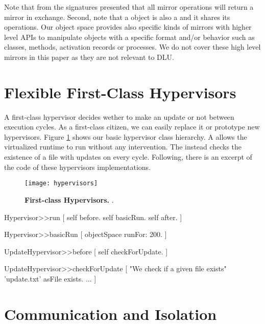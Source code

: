 Note that from the signatures presented that all mirror operations will return a mirror in exchange. Second, note that a  object is also a  and it shares its operations.
Our object space provides also specific kinds of mirrors with higher level APIs to manipulate objects with a specific format and/or behavior such as classes, methods, activation records or processes. We do not cover these high level mirrors in this paper as they are not relevant to DLU.


\section{Flexible First-Class Hypervisors}\label{sec:hypervisor}

A first-class hypervisor decides wether to make an update or not between execution cycles. As a first-class citizen, we can easily replace it or prototype new hypervisors. Figure \ref{fig:hypervisors} shows our basic hypervisor class hierarchy. A  allows the virtualized runtime to run without any intervention. The  instead checks the existence of a file with updates on every cycle. Following, there is an excerpt of the code of these hypervisors implementations.

\begin{figure}[ht]
\center
\texttt{[image: hypervisors]}
\caption{\textbf{First-class Hypervisors.} .\label{fig:hypervisors}}
\end{figure}

\begin{code}
Hypervisor>>run [
    self before.
    self basicRun.
    self after.
]

Hypervisor>>basicRun [
    objectSpace runFor: 200.
]

UpdateHypervisor>>before [
    self checkForUpdate.
]

UpdateHypervisor>>checkForUpdate [
    "We check if a given file exists"
    'update.txt' asFile exists.
    ...
]
\end{code}

\section{Communication and Isolation} \label{sec:communication}\label{sec:isolation}


